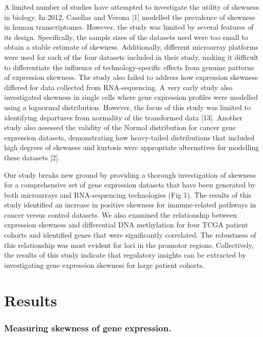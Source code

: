 \documentclass[11pt]{article}
\begin{document}
A limited number of studies have attempted to investigate the utility of skewness in biology. In 2012, Casellas and Verona [1] modelled the prevalence of skewness in human transcriptomes. However, the study was limited by several features of its design. Specifically, the sample sizes of the datasets used were too small to obtain a stable estimate of skewness. Additionally, different microarray platforms were used for each of the four datasets included in their study, making it difficult to differentiate the influence of technology-specific effects from genuine patterns of expression skewness. The study also failed to address how expression skewness differed for data collected from RNA-sequencing. A very early study also investigated skewness in single cells where gene expression profiles were modelled using a lognormal distribution. However, the focus of this study was limited to identifying departures from normality of the transformed data [13]. Another study also assessed the validity of the Normal distribution for cancer gene expression datasets, demonstrating how heavy-tailed distributions that included high degrees of skewness and kurtosis were appropriate alternatives for modelling these datasets [2]. 
\newline

Our study breaks new ground by providing a thorough investigation of skewness for a comprehensive set of gene expression datasets that have been generated by both microarrays and RNA-sequencing technologies (Fig 1). The results of this study identified an increase in positive skewness for immune-related pathways in cancer versus control datasets. We also examined the relationship between expression skewness and differential DNA methylation for four TCGA patient cohorts and identified genes that were significantly correlated. The robustness of this relationship was most evident for loci in the promotor regions. Collectively, the results of this study indicate that regulatory insights can be extracted by investigating gene expression skewness for large patient cohorts. 

\section*{Results}

\subsubsection*{Measuring skewness of gene expression.}
\end{document}
